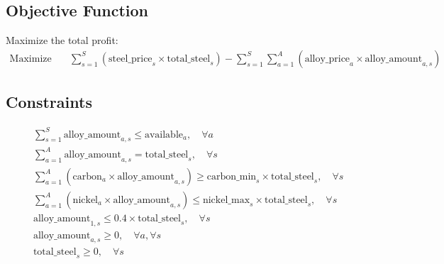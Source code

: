 \documentclass{article}
\begin{document}
\subsection*{Objective Function}
Maximize the total profit:
\begin{align*}
  \text{Maximize} \quad & \sum_{s=1}^{S} \left( \text{steel\_price}_s \times \text{total\_steel}_s \right) - \sum_{s=1}^{S} \sum_{a=1}^{A} \left( \text{alloy\_price}_a \times \text{alloy\_amount}_{a,s} \right)
\end{align*}

\subsection*{Constraints}
\begin{align*}
  & \sum_{s=1}^{S} \text{alloy\_amount}_{a,s} \leq \text{available}_a, \quad \forall a \\
  & \sum_{a=1}^{A} \text{alloy\_amount}_{a,s} = \text{total\_steel}_s, \quad \forall s \\
  & \sum_{a=1}^{A} \left( \text{carbon}_a \times \text{alloy\_amount}_{a,s} \right) \geq \text{carbon\_min}_s \times \text{total\_steel}_s, \quad \forall s \\
  & \sum_{a=1}^{A} \left( \text{nickel}_a \times \text{alloy\_amount}_{a,s} \right) \leq \text{nickel\_max}_s \times \text{total\_steel}_s, \quad \forall s \\
  & \text{alloy\_amount}_{1,s} \leq 0.4 \times \text{total\_steel}_s, \quad \forall s \\
  & \text{alloy\_amount}_{a,s} \geq 0, \quad \forall a, \forall s \\
  & \text{total\_steel}_s \geq 0, \quad \forall s \\
\end{align*}
\end{document}

